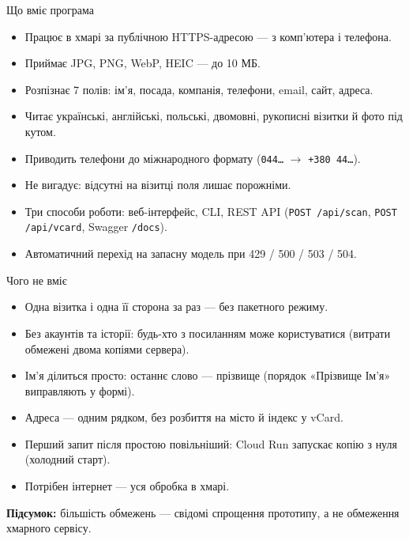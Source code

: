 \documentclass[aspectratio=169,11pt]{beamer}
\newcommand{\summary}[1]{\par\medskip\textbf{Підсумок:} #1}
\newcommand{\code}[1]{\texttt{#1}}
\begin{document}
\begin{frame}{Що вміє програма}
  \begin{itemize}
    \item Працює в хмарі за публічною HTTPS-адресою --- з комп'ютера і телефона.
    \item Приймає JPG, PNG, WebP, HEIC --- до 10 МБ.
    \item Розпізнає 7 полів: ім'я, посада, компанія, телефони, email, сайт, адреса.
    \item Читає українські, англійські, польські, двомовні, рукописні візитки й фото під кутом.
    \item Приводить телефони до міжнародного формату (\code{044\ldots} $\to$ \code{+380 44\ldots}).
    \item Не вигадує: відсутні на візитці поля лишає порожніми.
    \item Три способи роботи: веб-інтерфейс, CLI, REST API
          (\code{POST /api/scan}, \code{POST /api/vcard}, Swagger \code{/docs}).
    \item Автоматичний перехід на запасну модель при 429 / 500 / 503 / 504.
  \end{itemize}
\end{frame}

\begin{frame}{Чого не вміє}
  \begin{itemize}
    \item Одна візитка і одна її сторона за раз --- без пакетного режиму.
    \item Без акаунтів та історії: будь-хто з посиланням може користуватися
          (витрати обмежені двома копіями сервера).
    \item Ім'я ділиться просто: останнє слово --- прізвище (порядок «Прізвище Ім'я» виправляють у формі).
    \item Адреса --- одним рядком, без розбиття на місто й індекс у vCard.
    \item Перший запит після простою повільніший: Cloud Run запускає копію з нуля (холодний старт).
    \item Потрібен інтернет --- уся обробка в хмарі.
  \end{itemize}

  \summary{більшість обмежень --- свідомі спрощення прототипу, а не обмеження хмарного сервісу.}
\end{frame}
\end{document}
